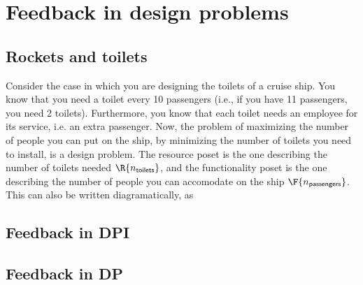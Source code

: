 

\section{Feedback in design problems}
\label{sec:feedbackindesign}

\subsection{Rockets and toilets}

Consider the case in which you are designing the toilets of a cruise ship. You know that you need a toilet every 10 passengers (i.e., if you have 11 passengers, you need 2 toilets). Furthermore, you know that each toilet needs an employee for its service, i.e. an extra passenger. Now, the problem of maximizing the number of people you can put on the ship, by minimizing the number of toilets you need to install, is a design problem. The resource poset is the one describing the number of toilets needed $\R{n_\mathsf{toilets}}$, and the functionality poset is the one describing the number of people you can accomodate on the ship $\F{n_\mathsf{passengers}}$.
This can also be written diagramatically, as
\begin{center}
\end{center}


\subsection{Feedback in DPI}




\subsection{Feedback in DP}

